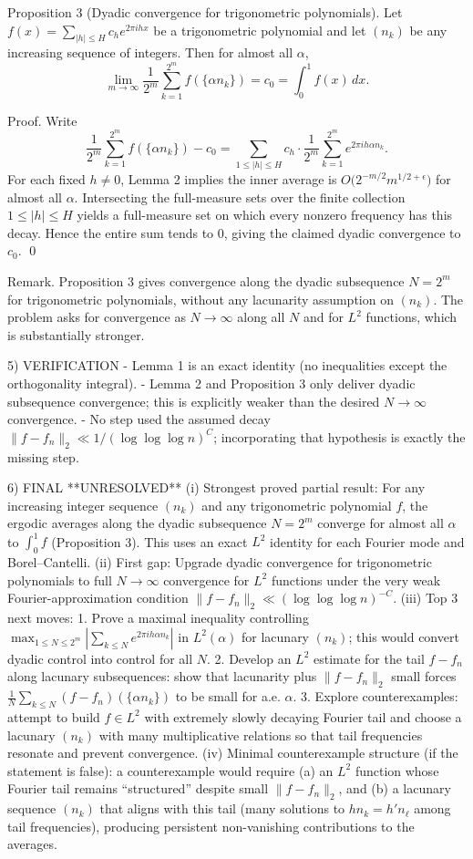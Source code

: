 Proposition 3 (Dyadic convergence for trigonometric polynomials).
Let $f(x)=\sum_{|h|\le H} c_h e^{2\pi i h x}$ be a trigonometric polynomial and let $(n_k)$ be any increasing sequence of integers.  Then for almost all $\alpha$,
\[
\lim_{m\to\infty}\frac{1}{2^m}\sum_{k=1}^{2^m} f(\{\alpha n_k\}) = c_0 = \int_0^1 f(x)\,dx.
\]

Proof.
Write
\[
\frac{1}{2^m}\sum_{k=1}^{2^m} f(\{\alpha n_k\}) - c_0
= \sum_{1\le |h|\le H} c_h \cdot \frac{1}{2^m}\sum_{k=1}^{2^m} e^{2\pi i h\alpha n_k}.
\]
For each fixed $h\neq 0$, Lemma 2 implies the inner average is $O\bigl(2^{-m/2} m^{1/2+\epsilon}\bigr)$ for almost all $\alpha$.  Intersecting the full-measure sets over the finite collection $1\le |h|\le H$ yields a full-measure set on which every nonzero frequency has this decay.  Hence the entire sum tends to $0$, giving the claimed dyadic convergence to $c_0$. \qed

Remark.
Proposition 3 gives convergence along the dyadic subsequence $N=2^m$ for trigonometric polynomials, without any lacunarity assumption on $(n_k)$.  The problem asks for convergence as $N\to\infty$ along all $N$ and for $L^2$ functions, which is substantially stronger.

5) VERIFICATION
- Lemma 1 is an exact identity (no inequalities except the orthogonality integral).
- Lemma 2 and Proposition 3 only deliver dyadic subsequence convergence; this is explicitly weaker than the desired $N\to\infty$ convergence.
- No step used the assumed decay $\|f-f_n\|_2\ll 1/(\log\log\log n)^C$; incorporating that hypothesis is exactly the missing step.

6) FINAL
**UNRESOLVED**
(i) Strongest proved partial result: For any increasing integer sequence $(n_k)$ and any trigonometric polynomial $f$, the ergodic averages along the dyadic subsequence $N=2^m$ converge for almost all $\alpha$ to $\int_0^1 f$ (Proposition 3).  This uses an exact $L^2$ identity for each Fourier mode and Borel--Cantelli.
(ii) First gap: Upgrade dyadic convergence for trigonometric polynomials to full $N\to\infty$ convergence for $L^2$ functions under the very weak Fourier-approximation condition $\|f-f_n\|_2\ll (\log\log\log n)^{-C}$.
(iii) Top 3 next moves:
  1. Prove a maximal inequality controlling $\max_{1\le N\le 2^m}\left|\sum_{k\le N} e^{2\pi i h\alpha n_k}\right|$ in $L^2(\alpha)$ for lacunary $(n_k)$; this would convert dyadic control into control for all $N$.
  2. Develop an $L^2$ estimate for the tail $f-f_n$ along lacunary subsequences: show that lacunarity plus $\|f-f_n\|_2$ small forces $\frac1N\sum_{k\le N}(f-f_n)(\{\alpha n_k\})$ to be small for a.e. $\alpha$.
  3. Explore counterexamples: attempt to build $f\in L^2$ with extremely slowly decaying Fourier tail and choose a lacunary $(n_k)$ with many multiplicative relations so that tail frequencies resonate and prevent convergence.
(iv) Minimal counterexample structure (if the statement is false): a counterexample would require (a) an $L^2$ function whose Fourier tail remains ``structured'' despite small $\|f-f_n\|_2$, and (b) a lacunary sequence $(n_k)$ that aligns with this tail (many solutions to $h n_k = h' n_\ell$ among tail frequencies), producing persistent non-vanishing contributions to the averages.




